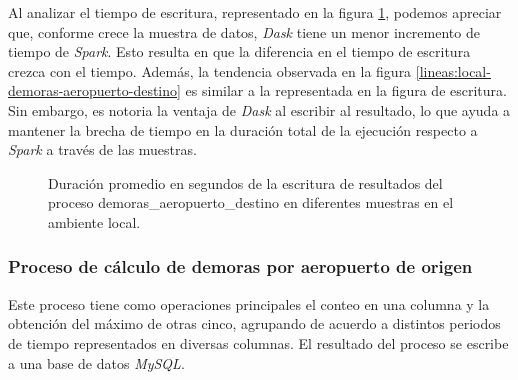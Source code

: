 Al analizar el tiempo de escritura, representado en la figura \ref{lineas:local-demoras-aeropuerto-destino-write}, podemos apreciar que, conforme crece la muestra de datos, \textit{Dask} tiene un menor incremento de tiempo de \textit{Spark}. Esto resulta en que la diferencia en el tiempo de escritura crezca con el tiempo. Además, la tendencia observada en la figura \ref{lineas:local-demoras-aeropuerto-destino} es similar a la representada en la figura de escritura. Sin embargo, es notoria la ventaja de \textit{Dask} al escribir al resultado, lo que ayuda a mantener la brecha de tiempo en la duración total de la ejecución respecto a \textit{Spark} a través de las muestras.

\begin{figure}
\centering
{}
\caption{Duración promedio en segundos de la escritura de resultados del proceso demoras\_aeropuerto\_destino en diferentes muestras en el ambiente local.}
\label{lineas:local-demoras-aeropuerto-destino-write}
\end{figure}

\subsubsection{Proceso de cálculo de demoras por aeropuerto de origen}

Este proceso tiene como operaciones principales el conteo en una columna y la obtención del máximo de otras cinco, agrupando de acuerdo a distintos periodos de tiempo representados en diversas columnas. El resultado del proceso se escribe a una base de datos \textit{MySQL}.

